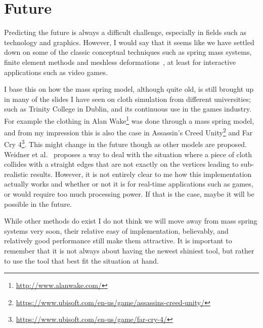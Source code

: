 \chapter{Future}
Predicting the future is always a difficult challenge, especially in fields such as technology and graphics.
However, I would say that it seems like we have settled down on some of the classic conceptual techniques such as spring mass systems, finite element methods and meshless deformations~\cite{muller2005meshless}, at least for interactive applications such as video games. 

I base this on how the mass spring model, although quite old, is still brought up in many of the slides I have seen on cloth simulation from different universities; such as Trinity College in Dublin\cite{mass_spring_cloth_trinity},
and its continuous use in the games industry.
For example the clothing in Alan Wake\footnote{\url{http://www.alanwake.com/}} was done through a mass spring model\cite{alan_wake_mass_spring}, and from my impression this is also the case
in Assassin's Creed Unity\footnote{\url{https://www.ubisoft.com/en-us/game/assassins-creed-unity/}} and Far Cry 4\footnote{\url{https://www.ubisoft.com/en-us/game/far-cry-4/}}\cite{ubisoft_cloth_simulation}.
This might change in the future though as other models are proposed. Weidner et al.~\cite{weidner_eol} proposes a way to deal with the situation where a piece of cloth collides with a straight edges that are not exactly on the vertices leading to sub-realistic results. 
However, it is not entirely clear to me how this implementation actually works and whether or not it is for real-time applications such as games, or would require too much processing power. 
If that is the case, maybe it will be possible in the future.

While other methods do exist I do not think we will move away from mass spring systems very soon, their relative easy of implementation, believably,
and relatively good performance still make them attractive.
It is important to remember that it is not always about having the newest shiniest tool, but rather to use the tool that best fit the situation at hand.
